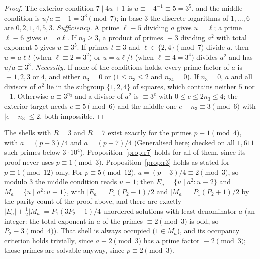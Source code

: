 \begin{proof}
The exterior condition $7\mid4u+1$ is $u\equiv-4^{-1}\equiv5=3^5$, and the middle condition is $u/a\equiv-1=3^3\pmod7$; in base $3$ the discrete logarithms of $1,\dots,6$ are $0,2,1,4,5,3$.
\emph{Sufficiency.} A prime $\ell\equiv5$ dividing $a$ gives $u=\ell$; a prime $\ell\equiv6$ gives $u=a\ell$. If $n_3\ge3$, a product of primes $\equiv3$ dividing $a^2$ with total exponent $5$ gives $u\equiv3^5$. If primes $t\equiv3$ and $\ell\in\{2,4\}\pmod 7$ divide $a$, then $u=a\ell t$ (when $\ell\equiv2=3^2$) or $u=a\ell/t$ (when $\ell\equiv4=3^4$) divides $a^2$ and has $u/a\equiv3^3$.
\emph{Necessity.} If none of the conditions holds, every prime factor of $a$ is $\equiv1,2,3$ or $4$, and either $n_3=0$ or ($1\le n_3\le2$ and $n_{24}=0$). If $n_3=0$, $a$ and all divisors of $a^2$ lie in the subgroup $\{1,2,4\}$ of squares, which contains neither $5$ nor $-1$. Otherwise $a\equiv3^{n_3}$ and a divisor of $a^2$ is $\equiv3^e$ with $0\le e\le2n_3\le4$; the exterior target needs $e\equiv5\pmod6$ and the middle one $e-n_3\equiv3\pmod6$ with $|e-n_3|\le2$, both impossible.
\end{proof}

The shells with $R=3$ and $R=7$ exist exactly for the primes $p\equiv1\pmod4$, with $a=(p+3)/4$ and $a=(p+7)/4$ (\textsf{Generalised here}; checked on all $1{,}611$ such primes below $3\cdot10^4$). Proposition~\ref{prop:r7} holds for all of them, since its proof never uses $p\equiv1\pmod3$. Proposition~\ref{prop:r3} holds as stated for $p\equiv1\pmod{12}$ only. For $p\equiv5\pmod{12}$, $a=(p+3)/4\equiv2\pmod3$, so modulo $3$ the middle condition reads $u\equiv1$; then $E_a=\{u\mid a^2:u\equiv2\}$ and $M_a=\{u\mid a^2:u\equiv1\}$, with $|E_a|=P_1(P_2-1)/2$ and $|M_a|=P_1(P_2+1)/2$ by the parity count of the proof above, and there are exactly $|E_a|+\frac12|M_a|=P_1(3P_2-1)/4$ unordered solutions with least denominator $a$ (an integer: the total exponent in $a$ of the primes $\equiv2\pmod3$ is odd, so $P_2\equiv3\pmod4$). That shell is always occupied ($1\in M_a$), and its occupancy criterion holds trivially, since $a\equiv2\pmod3$ has a prime factor $\equiv2\pmod3$; those primes are solvable anyway, since $p\equiv2\pmod3$.

